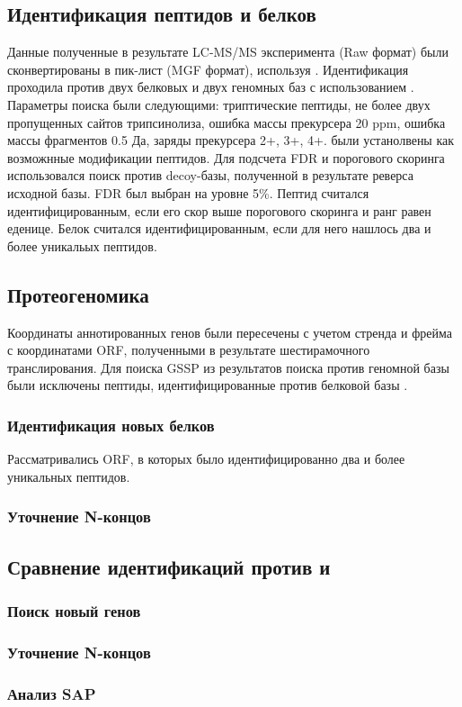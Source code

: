 \subsection{Идентификация пептидов и белков}
Данные полученные в результате LC-MS/MS эксперимента (Raw формат) были сконвертированы в пик-лист (MGF формат), используя  \cite{chambers2012cross}. Идентификация проходила против двух белковых и двух геномных баз с использованием  \cite{cottrell1999probability}. Параметры поиска были следующими: триптические пептиды, не более двух пропущенных сайтов трипсинолиза, ошибка массы прекурсера 20 ppm, ошибка массы фрагментов 0.5 Да, заряды прекурсера 2+, 3+, 4+.  были устанолвены как возможнные модификации пептидов. Для подсчета FDR и порогового скоринга использовался поиск против decoy-базы, полученной в результате реверса исходной базы. FDR был выбран на уровне 5\%.
Пептид считался идентифицированным, если его скор выше порогового скоринга и ранг равен еденице. Белок считался идентифицированным, если для него нашлось два и более уникальых пептидов.

\subsection{Протеогеномика }
Координаты аннотированных генов были пересечены с учетом стренда и фрейма с координатами ORF, полученными в результате шестирамочного транслирования.
Для поиска GSSP из результатов поиска против геномной базы  были исключены пептиды, идентифицированные против белковой базы . 

\subsubsection{Идентификация новых белков}
Рассматривались ORF, в которых было идентифицированно два и более уникальных пептидов.

\subsubsection{Уточнение N-концов}

\subsection{Сравнение идентификаций против  и }

\subsubsection{Поиск новый генов}

\subsubsection{Уточнение N-концов}

\subsubsection{Анализ SAP}





\newpage
